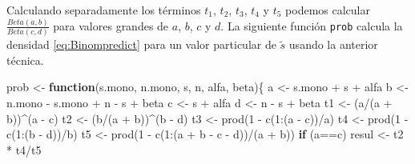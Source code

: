 \documentclass[
  spanish,
]{book}
\newenvironment{Shaded}{\begin{snugshade}}{\end{snugshade}}
\newcommand{\ControlFlowTok}[1]{\textcolor[rgb]{0.13,0.29,0.53}{\textbf{#1}}}
\newcommand{\DecValTok}[1]{\textcolor[rgb]{0.00,0.00,0.81}{#1}}
\newcommand{\FunctionTok}[1]{\textcolor[rgb]{0.00,0.00,0.00}{#1}}
\newcommand{\NormalTok}[1]{#1}
\newcommand{\OtherTok}[1]{\textcolor[rgb]{0.56,0.35,0.01}{#1}}
\newcommand{\SpecialCharTok}[1]{\textcolor[rgb]{0.00,0.00,0.00}{#1}}
\theoremstyle{definition}
\theoremstyle{definition}
\theoremstyle{definition}
\theoremstyle{definition}
\theoremstyle{remark}
\begin{document}
Calculando separadamente los términos \(t_1\), \(t_2\), \(t_3\), \(t_4\) y \(t_5\)
podemos calcular \(\frac{Beta(a,b)}{Beta(c,d)}\) para valores grandes de
\(a\), \(b\), \(c\) y \(d\). La siguiente función \texttt{prob} calcula la
densidad \eqref{eq:Binompredict} para un valor particular de \(\tilde{s}\)
usando la anterior técnica.

\begin{Shaded}
\begin{Highlighting}[]
\NormalTok{prob }\OtherTok{\textless{}{-}} \ControlFlowTok{function}\NormalTok{(s.mono, n.mono, s, n, alfa, beta)\{}
\NormalTok{  a }\OtherTok{\textless{}{-}}\NormalTok{ s.mono }\SpecialCharTok{+}\NormalTok{ s }\SpecialCharTok{+}\NormalTok{ alfa}
\NormalTok{  b }\OtherTok{\textless{}{-}}\NormalTok{ n.mono }\SpecialCharTok{{-}}\NormalTok{ s.mono }\SpecialCharTok{+}\NormalTok{ n }\SpecialCharTok{{-}}\NormalTok{ s }\SpecialCharTok{+}\NormalTok{ beta }
\NormalTok{  c }\OtherTok{\textless{}{-}}\NormalTok{ s }\SpecialCharTok{+}\NormalTok{ alfa}
\NormalTok{  d }\OtherTok{\textless{}{-}}\NormalTok{ n }\SpecialCharTok{{-}}\NormalTok{ s }\SpecialCharTok{+}\NormalTok{ beta}
\NormalTok{  t1 }\OtherTok{\textless{}{-}}\NormalTok{ (a}\SpecialCharTok{/}\NormalTok{(a }\SpecialCharTok{+}\NormalTok{ b))}\SpecialCharTok{\^{}}\NormalTok{(a }\SpecialCharTok{{-}}\NormalTok{ c)}
\NormalTok{  t2 }\OtherTok{\textless{}{-}}\NormalTok{ (b}\SpecialCharTok{/}\NormalTok{(a }\SpecialCharTok{+}\NormalTok{ b))}\SpecialCharTok{\^{}}\NormalTok{(b }\SpecialCharTok{{-}}\NormalTok{ d) }
\NormalTok{  t3 }\OtherTok{\textless{}{-}} \FunctionTok{prod}\NormalTok{(}\DecValTok{1} \SpecialCharTok{{-}} \FunctionTok{c}\NormalTok{(}\DecValTok{1}\SpecialCharTok{:}\NormalTok{(a }\SpecialCharTok{{-}}\NormalTok{ c))}\SpecialCharTok{/}\NormalTok{a)}
\NormalTok{  t4 }\OtherTok{\textless{}{-}} \FunctionTok{prod}\NormalTok{(}\DecValTok{1} \SpecialCharTok{{-}} \FunctionTok{c}\NormalTok{(}\DecValTok{1}\SpecialCharTok{:}\NormalTok{(b }\SpecialCharTok{{-}}\NormalTok{ d))}\SpecialCharTok{/}\NormalTok{b) }
\NormalTok{  t5 }\OtherTok{\textless{}{-}} \FunctionTok{prod}\NormalTok{(}\DecValTok{1} \SpecialCharTok{{-}} \FunctionTok{c}\NormalTok{(}\DecValTok{1}\SpecialCharTok{:}\NormalTok{(a }\SpecialCharTok{+}\NormalTok{ b }\SpecialCharTok{{-}}\NormalTok{ c }\SpecialCharTok{{-}}\NormalTok{ d))}\SpecialCharTok{/}\NormalTok{(a }\SpecialCharTok{+}\NormalTok{ b))}
  \ControlFlowTok{if}\NormalTok{ (a}\SpecialCharTok{==}\NormalTok{c) }
\NormalTok{    resul }\OtherTok{\textless{}{-}}\NormalTok{ t2 }\SpecialCharTok{*}\NormalTok{ t4}\SpecialCharTok{/}\NormalTok{t5 }

\end{Highlighting}
\end{Shaded}
\end{document}
